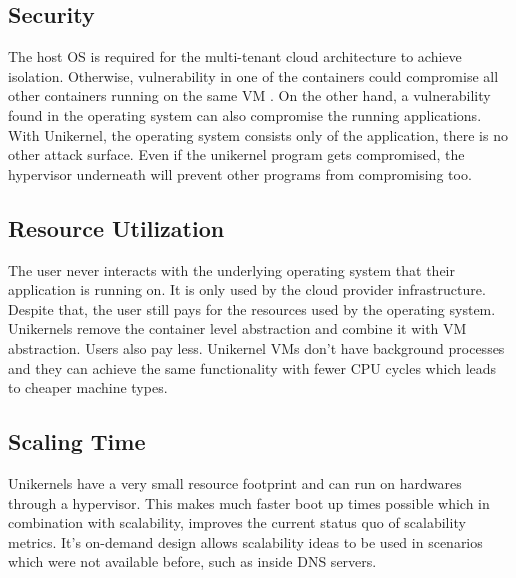 \subsection{Security}
 The host OS is required for the multi-tenant cloud architecture to achieve isolation. Otherwise, vulnerability in one of the containers could compromise all other containers running on the same VM \cite{CVE-2018-9862-details}. On the other hand, a vulnerability found in the operating system can also compromise the running applications. With Unikernel, the operating system consists only of the application, there is no other attack surface. Even if the unikernel program gets compromised, the hypervisor underneath will prevent other programs from compromising too.

\subsection{Resource Utilization}
The user never interacts with the underlying operating system that their application is running on. It is only used by the cloud provider infrastructure. Despite that, the user still pays for the resources used by the operating system. Unikernels remove the container level abstraction and combine it with VM abstraction. Users also pay less. Unikernel VMs don't have background processes and they can achieve the same functionality with fewer CPU cycles which leads to cheaper machine types.

\subsection{Scaling Time}
Unikernels have a very small resource footprint and can run on hardwares through a hypervisor. This makes much faster boot up times possible which in combination with scalability, improves the current status quo of scalability metrics. It's on-demand design allows scalability ideas to be used in scenarios which were not available before, such as inside DNS servers.


